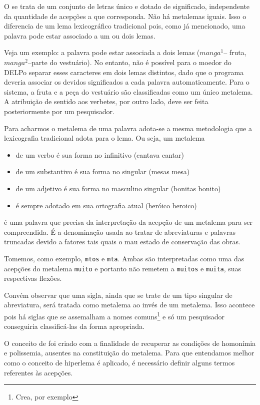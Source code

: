 O  se trata de um conjunto de letras único e dotado de significado,
independente da quantidade de acepções a que corresponda. Não há metalemas iguais.
Isso o diferencia de um lema lexicográfico tradicional pois, como já mencionado,
uma palavra pode estar associado a um ou dois lemas.

Veja um exemplo: a palavra  pode estar associada a dois lemas ($manga^1$--
fruta, $manga^2$--parte do vestuário). No entanto, não é possível para o moedor do
DELPo separar esses caracteres em dois lemas distintos, dado que o programa deveria
associar os devidos significados a cada palavra automaticamente. Para o sistema, a
fruta e a peça do vestuário são classificadas como um único metalema. A atribuição
de sentido aos verbetes, por outro lado, deve ser feita posteriormente por um
pesquisador.

Para acharmos o metalema de uma palavra adota-se a mesma metodologia que a lexicografia
tradicional adota para o lema. Ou seja, um metalema
\begin{itemize}
    \item de um verbo é sua forma no infinitivo (cantava \dir cantar)
    \item de um substantivo é sua forma no singular (mesas \dir mesa)
    \item de um adjetivo é sua forma no masculino singular (bonitas \dir bonito)
    \item é sempre adotado em sua ortografia atual (heróico \dir heroico)
\end{itemize}

 é uma palavra que precisa da interpretação da acepção de um metalema para ser
compreendida. É a denominação usada ao tratar de abreviaturas e palavras truncadas devido a
fatores tais quais o mau estado de conservação das obras.

Tomemos, como exemplo, \texttt{mtos} e \texttt{mta}. Ambas são interpretadas como uma das
acepções do metalema \texttt{muito} e portanto não remetem a \texttt{muitos} e \texttt{muita},
suas respectivas flexões.

Convém observar que uma sigla, ainda que se trate de um tipo singular de abreviatura, será
tratada como metalema ao invés de um metalema. Isso acontece pois há siglas que se assemalham
a nomes comuns\footnote{Crea, por exemplo} e só um pesquisador conseguiria classificá-las
da forma apropriada.

O conceito de  foi criado com a finalidade de recuperar as condições de homonímia
e polissemia, ausentes na constituição do metalema. Para que entendamos melhor como o conceito
de hiperlema é aplicado, é necessário definir alguns termos referentes às acepções.

